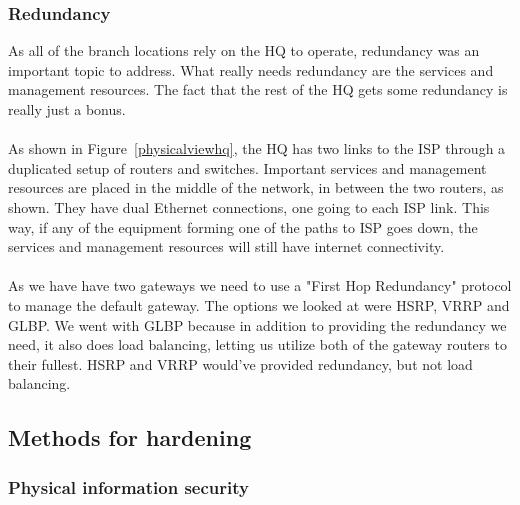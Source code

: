 
\subsubsection{Redundancy}

As all of the branch locations rely on the HQ to operate, redundancy was an important topic to address. What really needs redundancy are the services and management resources. The fact that the rest of the HQ gets some redundancy is really just a bonus.
\\
\\
As shown in Figure~\ref{physicalviewhq}, the HQ has two links to the ISP through a duplicated setup of routers and switches. Important services and management resources are placed in the middle of the network, in between the two routers, as shown. They have dual Ethernet connections, one going to each ISP link. This way, if any of the equipment forming one of the paths to ISP goes down, the services and management resources will still have internet connectivity.
\\
\\
As we have have two gateways we need to use a "First Hop Redundancy" protocol to manage the default gateway. The options we looked at were HSRP, VRRP and GLBP. We went with GLBP because in addition to providing the redundancy we need, it also does load balancing, letting us utilize both of the gateway routers to their fullest. HSRP and VRRP would've provided redundancy, but not load balancing.




\subsection{Methods for hardening}

\subsubsection{Physical information security} %

